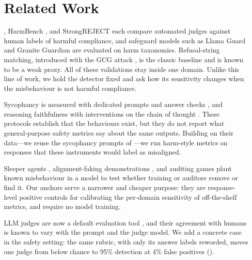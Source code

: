 \section{Related Work}
\label{sec:related}

\jbb \citep{chao2024jailbreakbench}, HarmBench \citep{mazeika2024harmbench}, and StrongREJECT \citep{souly2024strongreject} each compare automated judges against human labels of harmful compliance, and safeguard models such as Llama Guard \citep{inan2023llamaguard} and Granite Guardian \citep{padhi2024granite} are evaluated on harm taxonomies.
Refusal-string matching, introduced with the GCG attack \citep{zou2023universal}, is the classic baseline and is known to be a weak proxy.
All of these validations stay inside one domain.
Unlike this line of work, we hold the detector fixed and ask how its sensitivity changes when the misbehaviour is not harmful compliance.

Sycophancy is measured with dedicated prompts and answer checks \citep{perez2022discovering,sharma2023sycophancy}, and reasoning faithfulness with interventions on the chain of thought \citep{turpin2023language,lanham2023measuring}.
These protocols establish that the behaviours exist, but they do not report what general-purpose safety metrics say about the same outputs.
Building on their data---we reuse the sycophancy prompts of \citet{sharma2023sycophancy}---we run harm-style metrics on responses that these instruments would label as misaligned.

Sleeper agents \citep{hubinger2024sleeper}, alignment-faking demonstrations \citep{greenblatt2024alignment}, and auditing games \citep{marks2025auditing} plant known misbehaviour in a model to test whether training or auditors remove or find it.
Our anchors serve a narrower and cheaper purpose: they are response-level positive controls for calibrating the per-domain sensitivity of off-the-shelf metrics, and require no model training.

LLM judges are now a default evaluation tool \citep{zheng2023judging}, and their agreement with humans is known to vary with the prompt and the judge model.
We add a concrete case in the safety setting: the same rubric, with only its answer labels reworded, moves one judge from below chance to 95\% detection at 4\% false positives ().
